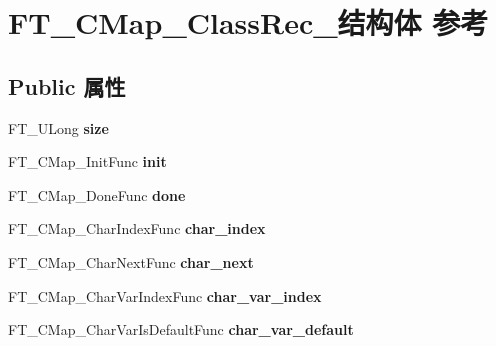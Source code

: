 \hypertarget{struct_f_t___c_map___class_rec__}{}\section{F\+T\+\_\+\+C\+Map\+\_\+\+Class\+Rec\+\_\+结构体 参考}
\label{struct_f_t___c_map___class_rec__}
\subsection*{Public 属性}
\begin{DoxyCompactItemize}
\item 
\mbox{\label{struct_f_t___c_map___class_rec___a86283cf239b9c0e559c9acbaa004def6}} 
F\+T\+\_\+\+U\+Long {\bfseries size}
\item 
\mbox{\label{struct_f_t___c_map___class_rec___afe1da0877ec0686dfe7b2e020fc0d408}} 
F\+T\+\_\+\+C\+Map\+\_\+\+Init\+Func {\bfseries init}
\item 
\mbox{\label{struct_f_t___c_map___class_rec___a00d1d77a4d926340b4d97bc03cd29231}} 
F\+T\+\_\+\+C\+Map\+\_\+\+Done\+Func {\bfseries done}
\item 
\mbox{\label{struct_f_t___c_map___class_rec___ad1c0448188e8d52f6159b5521bb2dc83}} 
F\+T\+\_\+\+C\+Map\+\_\+\+Char\+Index\+Func {\bfseries char\+\_\+index}
\item 
\mbox{\label{struct_f_t___c_map___class_rec___a053362f31fcfbc6a284cc8d026ab57ff}} 
F\+T\+\_\+\+C\+Map\+\_\+\+Char\+Next\+Func {\bfseries char\+\_\+next}
\item 
\mbox{\label{struct_f_t___c_map___class_rec___a6bc46e2595aec30295e6d2bfc362afcb}} 
F\+T\+\_\+\+C\+Map\+\_\+\+Char\+Var\+Index\+Func {\bfseries char\+\_\+var\+\_\+index}
\item 
\mbox{\label{struct_f_t___c_map___class_rec___ac8305cb0aebd02b54c0046765f28ef4a}} 
F\+T\+\_\+\+C\+Map\+\_\+\+Char\+Var\+Is\+Default\+Func {\bfseries char\+\_\+var\+\_\+default}
\item 

\end{DoxyCompactItemize}
